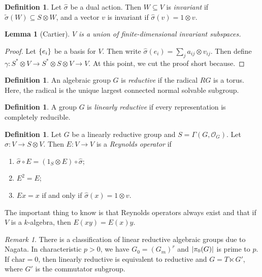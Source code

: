 \documentclass[leqno, openany]{memoir}
\newtheorem{lem}[thm]{Lemma}
\theoremstyle{definition}
\newtheorem{defn}[thm]{Definition}
\theoremstyle{remark}
\newtheorem{rmk}[thm]{Remark}
\theoremstyle{plain}
\theoremstyle{definition}
\theoremstyle{remark}
\newcommand{\mc}[1]{\mathcal{#1}}
\newcommand{\mr}[1]{\mathrm{#1}}
\newcommand{\wt}[1]{\widetilde{#1}}
\newcommand{\wh}[1]{\widehat{#1}}
\begin{document}
\begin{defn} Let $\wh{\sigma}$ be a dual action. Then $W \subseteq V$ is
\textit{invariant} if $\wt{\sigma}(W) \subseteq S \otimes  W$, and a vector $v$
is invariant if $\wh{\sigma}(v) = 1 \otimes v$.  \end{defn}

\begin{lem}[Cartier] $V$ is a union of finite-dimensional invariant subspaces.
\end{lem}

\begin{proof} Let $\qty{e_i}$ be a basis for $V$. Then write $\wh{\sigma}(e_i)
= \sum_j a_{ij} \otimes v_{ij}$. Then define $\gamma \colon S^* \otimes V \to
S^* \otimes S \otimes V \to V$. At this point, we cut the proof short because.
\end{proof}

\begin{defn} An algebraic group $G$ is \textit{reductive} if the radical $RG$
is a torus. Here, the radical is the unique largest connected normal solvable
subgroup.  \end{defn}

\begin{defn} A group $G$ is \textit{linearly reductive} if every representation
is completely reducible.  \end{defn}

\begin{defn} Let $G$ be a linearly reductive group and $S = \Gamma(G,
    \mc{O}_G)$. Let $\wh{\sigma} \colon V \to S \otimes V$. Then $E \colon V
    \to V$ is a \textit{Reynolds operator} if \begin{enumerate} \item
        $\wh{\sigma} \circ E = (1_S \otimes E) \circ \wh{\sigma}$; \item $E^2 =
E$; \item $Ex=x$ if and only if $\wh{\sigma}(x) = 1 \otimes v$.
\end{enumerate} \end{defn}

The important thing to know is that Reynolds operators always exist and that if
$V$ is a $k$-algebra, then $E(xy) = E(x)y$.

\begin{rmk} There is a classification of linear reductive algebraic groups due
    to Nagata. In characteristic $p > 0$, we have $G_0 = (G_m)^r$ and
    $\abs{\pi_0(G)}$ is prime to $p$. If $\mr{char} = 0$, then linearly
    reductive is equivalent to reductive and $G = T \ltimes G'$, where $G'$ is
    the commutator subgroup.  \end{rmk}
\end{document}
